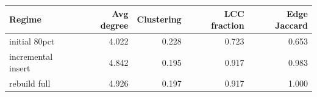 \begin{tabular}{lrrrr}
\toprule
Regime & Avg degree & Clustering & LCC fraction & Edge Jaccard \\
\midrule
initial 80pct & 4.022 & 0.228 & 0.723 & 0.653 \\
incremental insert & 4.842 & 0.195 & 0.917 & 0.983 \\
rebuild full & 4.926 & 0.197 & 0.917 & 1.000 \\
\bottomrule
\end{tabular}
